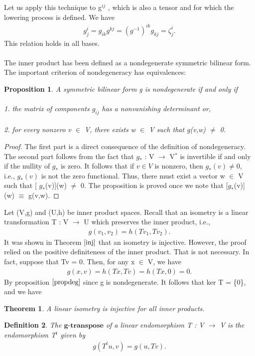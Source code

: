 \documentclass[12pt,a4paper]{article}
\newtheorem{thm}{Theorem}
\newtheorem{defn}[thm]{Definition}
\newtheorem{prop}{Proposition}
\begin{document}
Let us apply this technique to g$^{ij}$ , which is also a tensor and for which
the lowering process is defined. We have
\begin{eqnarray*}
g^i_j = g_{ik}g^{kj} = (g^{-1})^{ik} g_{kj} = \zeta_j^i.
\end{eqnarray*}
This relation holds in all bases.\\
\\
The inner product has been defined as a nondegenerate symmetric bilinear form. The important criterion of nondegeneracy has equivalences:
\begin{prop} \label{propdeg}
A symmetric bilinear form g is nondegenerate if
and only if\\ \\
1. the matrix of components $g_{ij}$ has a nonvanishing determinant or,\\ \\
2. for every nonzero v $\in$ V, there exists w $\in$ V such that g(v,w) $\ne$ 0.
\end{prop}
\begin{proof}
The first part is a direct consequence of the definition of nondegeneracy. The second part follows from the fact that $g_*$ : V $\to$ V$^*$ is invertible if and only if the nullity of $g_*$ is zero.  It follows that if $v \in V$ is nonzero, then $g_*(v) \ne 0,$ i.e., $g_*(v)$ is not the zero functional. Thus, there must exist a
vector w $\in$ V such that [ $g_*$(v)](w) $\ne$ 0. The proposition is proved once we
note that [$g_*$(v)](w) $\equiv$ g(v,w).
\end{proof}
Let (V,g) and (U,h) be inner product spaces. Recall that an isometry is
a linear transformation T : V $\to$ U which preserves the inner product, i.e.,
\begin{eqnarray*}
g(v_1, v_2) = h(T v_1, T v_2).
\end{eqnarray*}
It was shown in Theorem $\ref{inj}$ that  an isometry is injective. However, the
proof relied on the positive definiteness of the inner product. That is not
necessary. In fact, suppose that Tv = 0. Then, for any x $\in$ V, we have
\begin{eqnarray*}
g(x, v) = h(Tx,Tv) = h(Tx,0) = 0.
\end{eqnarray*}
By proposition $\ref{propdeg}$ since g is nondegenerate. It follows that
ker T = \{0\}, and we have
\begin{thm}
A linear isometry is injective for all inner products.
\end{thm}
\begin{defn}
The $\textbf{g-transpose}$ of a linear endomorphism T : V $\to$ V is
the endomorphism T$^t$ given by
\begin{eqnarray*}
g(T^t u, v) = g(u, Tv).
\end{eqnarray*}
\end{defn}
\end{document}
